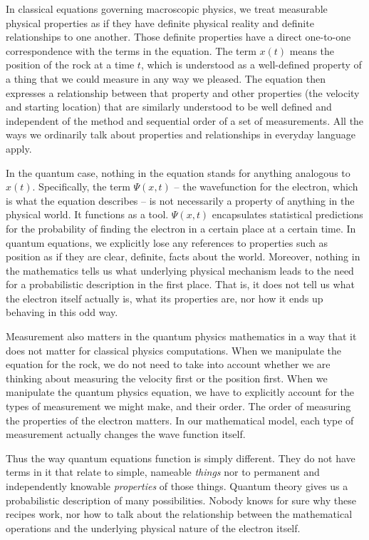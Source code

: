 \documentclass[onecolumn,preprintnumbers,amsmath,amssymbn,reprint,nofootinbib,superscriptaddress]{revtex4}    %
\begin{document}
In classical equations governing macroscopic physics, we treat measurable physical properties as if they have definite physical reality and definite relationships to one another.  Those definite properties have a direct one-to-one correspondence with the terms in the equation.  The term $x(t)$ means the position of the rock at a time $t$, which is understood as a well-defined property of a thing that we could measure in any way we pleased.  The equation then expresses a relationship between that property and other properties (the velocity and starting location) that are similarly understood to be well defined and independent of the method and sequential order of a set of measurements.   All the ways we ordinarily talk about properties and relationships in everyday language apply.  

In the quantum case, nothing in the equation stands for anything analogous to $x(t)$.  Specifically, the term $\Psi(x,t)$  -- the wavefunction for the electron, which is what the equation describes -- is not necessarily a property of anything in the physical world.  It functions as a tool.  $\Psi(x,t)$ encapsulates statistical predictions for the probability of finding the electron in a certain place at a certain time.  In quantum equations, we explicitly lose any references to properties such as position as if they are clear, definite, facts about the world. Moreover, nothing in the mathematics tells us what underlying physical mechanism leads to the need for a probabilistic description in the first place.  That is, it does not tell us what the electron itself actually is, what its properties are, nor how it ends up behaving in this odd way.

Measurement also matters in the quantum physics mathematics in a way that it does not matter for classical physics computations.  When we manipulate the equation for the rock, we do not need to take into account whether we are thinking about measuring the velocity first or the position first.  When we manipulate the quantum physics equation, we have to explicitly account for the types of measurement we might make, and their order. The order of measuring the properties of the electron matters.  In our mathematical model, each type of measurement actually changes the wave function itself.  

Thus the way quantum equations function is simply different.  They do not have terms in it that relate to simple, nameable {\em things} nor to permanent and independently knowable {\em properties} of those things.  Quantum theory gives us a probabilistic description of many possibilities.  Nobody knows for sure why these recipes work, nor how to talk about the relationship between the mathematical operations and the underlying physical nature of the electron itself.  
\end{document}
